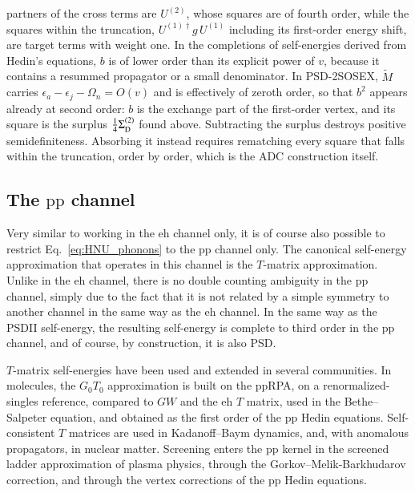 \documentclass[aip,jcp,reprint,noshowkeys,superscriptaddress]{revtex4-1}
\newcommand{\eps}{\epsilon}
\newcommand{\eh}{\text{eh}}
\newcommand{\pp}{\text{pp}}
\begin{document}
partners of the cross terms are $U^{(2)}$, whose squares are of fourth order,
while the squares within the truncation, $U^{(1)\dagger}g\,U^{(1)}$ including
its first-order energy shift, are target terms with weight one. In the
completions of self-energies derived from Hedin's equations, $b$ is of lower
order than its explicit power of $v$, because it contains a resummed
propagator or a small denominator. In PSD-2SOSEX, $\widetilde M$ carries
$\eps_a-\eps_j-\Omega_n=O(v)$ and is effectively of zeroth order, so that
$b^2$ appears already at second order: $b$ is the exchange part of the
first-order vertex, and its square is the surplus
$\tfrac14\Sigma^{(2)}_{\rm D}$ found above.
Subtracting the surplus destroys positive semidefiniteness. Absorbing it
instead requires rematching every square that falls within the truncation,
order by order, which is the ADC construction itself.

\subsection{The $\pp$ channel}
Very similar to working in the $\eh$ channel only, it is 
of course also possible to restrict Eq.~\eqref{eq:HNU_phonons} to the 
$\pp$ channel only. The canonical self-energy approximation that operates in this 
channel is the $T$-matrix approximation.\cite{orlando2023three, Marie2024a}
Unlike in the $\eh$ channel, there is no double counting ambiguity in the 
$\pp$ channel, simply due to the fact that it is not related by a simple symmetry to another 
channel in the same way as the $\eh$ channel. In the same way as the PSDII self-energy, 
the resulting self-energy is complete to third order in the $\pp$ channel, and of course, by construction, 
it is also PSD.

$T$-matrix self-energies have been used and extended in several
communities. In molecules, the $G_0T_0$ approximation is built on the
ppRPA,\cite{Zhang2017} on a renormalized-singles
reference,\cite{Li2021} compared to $GW$ and the $\eh$ $T$
matrix,\cite{orlando2023three} used in the Bethe--Salpeter
equation,\cite{Loos2022} and obtained as the first order of the $\pp$
Hedin equations.\cite{Marie2024a} Self-consistent $T$ matrices are used
in Kadanoff--Baym dynamics,\cite{Kohler1999,PuigvonFriesen2009,PuigvonFriesen2010,Schluenzen2020,Joost2020}
and, with anomalous propagators, in nuclear
matter.\cite{Bozek2002,Bozek2003} Screening enters the $\pp$ kernel in
the screened ladder approximation of plasma
physics,\cite{Kraeft1986,Kremp2005,Bonitz2016} through the
Gorkov--Melik-Barkhudarov correction,\cite{Pisani2018} and through the
vertex corrections of the $\pp$ Hedin equations.\cite{Marie2024a}
\end{document}
